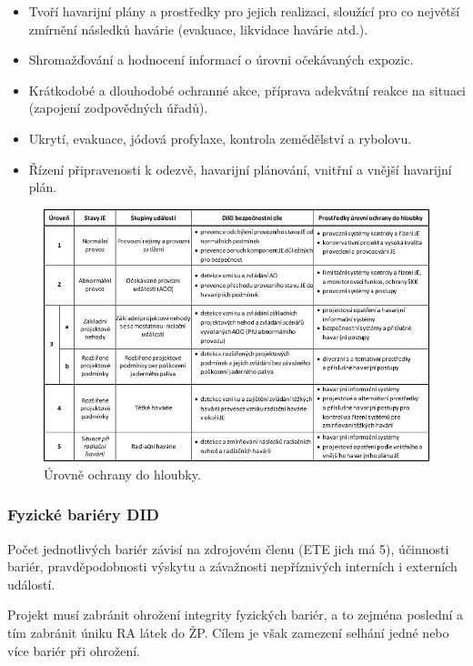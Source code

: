 \begin{itemize}
        \begin{itemize}
            \item Tvoří havarijní plány a prostředky pro jejich realizaci, sloužící pro co největší zmírnění následků havárie (evakuace, likvidace havárie atd.).
            \item Shromažďování a hodnocení informací o úrovni očekávaných expozic.
            \item Krátkodobé a dlouhodobé ochranné akce, příprava adekvátní reakce na situaci (zapojení zodpovědných úřadů).
            \item Ukrytí, evakuace, jódová profylaxe, kontrola zemědělství a rybolovu.
            \item Řízení připravenosti k odezvě, havarijní plánování, vnitřní a vnější havarijní plán.
        \end{itemize}

\end{itemize}

\begin{figure}[h!]
    \centering
    \includegraphics[width=\textwidth]{img/Úrovně ochrany do hloubky.png}
    \caption{Úrovně ochrany do hloubky.}
\end{figure}

\subsubsection{Fyzické bariéry DID}

Počet jednotlivých bariér závisí na zdrojovém členu (ETE jich má 5), účinnosti bariér, pravděpodobnosti výskytu a závažnosti nepříznivých interních i externích událostí.

Projekt musí zabránit ohrožení integrity fyzických bariér, a to zejména poslední a tím zabránit úniku RA látek do ŽP. Cílem je však zamezení selhání jedné nebo více bariér při ohrožení.


